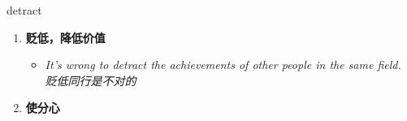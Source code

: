 
\begin{frame}
{\huge detract}
\begin{center}
\begin{enumerate}\Large
  \item \textbf{贬低，降低价值}
  \begin{itemize}
    \item \em{\Large{It's wrong to detract the achievements of other people in the same field. 贬低同行是不对的}}
  \end{itemize}
  \item \textbf{使分心}
\end{enumerate}
\end{center}
\end{frame}
